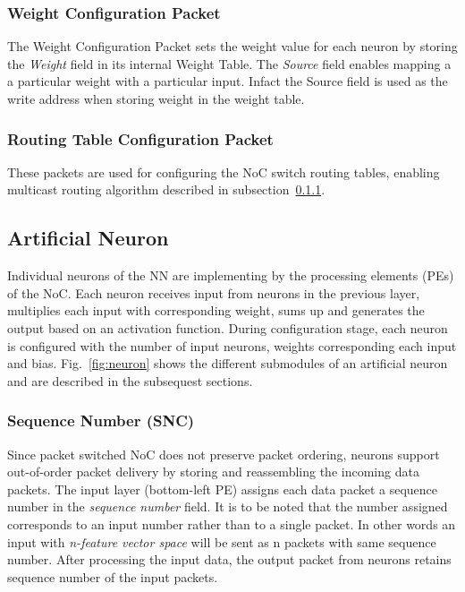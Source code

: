 \subsubsection*{\bf Weight Configuration Packet}
The Weight Configuration Packet sets the weight value for each neuron by storing the \emph{Weight} field in its internal Weight Table.
The \emph{Source} field enables mapping a a particular weight with a particular input.
Infact the Source field is used as the write address when storing weight in the weight table.
\subsubsection*{\bf Routing Table Configuration Packet}
These packets are used for configuring the NoC switch routing tables, enabling multicast routing algorithm described in subsection~\ref{}.

\subsection{Artificial Neuron}
Individual neurons of the NN are implementing by the processing elements (PEs) of the NoC.
Each neuron receives input from neurons in the previous layer, multiplies each input with corresponding weight, sums up and generates the output based on an activation function.
During configuration stage, each neuron is configured with the number of input neurons, weights corresponding each input and bias.
Fig.~\ref{fig:neuron} shows the different submodules of an artificial neuron and are described in the subsequest sections.
\subsubsection{\bf Sequence Number (SNC)}
 
Since packet switched NoC does not preserve packet ordering, neurons support out-of-order packet delivery by storing and reassembling the incoming data packets. 
The input layer (bottom-left PE) assigns each data packet a sequence number in the \emph{sequence number} field. 
It is to be noted that the number assigned corresponds to an input number rather than to a single packet.
In other words an input with \emph{n-feature vector space} will be sent as n packets with same sequence number. 
After processing the input data, the output packet from neurons retains sequence number of the input packets. 

